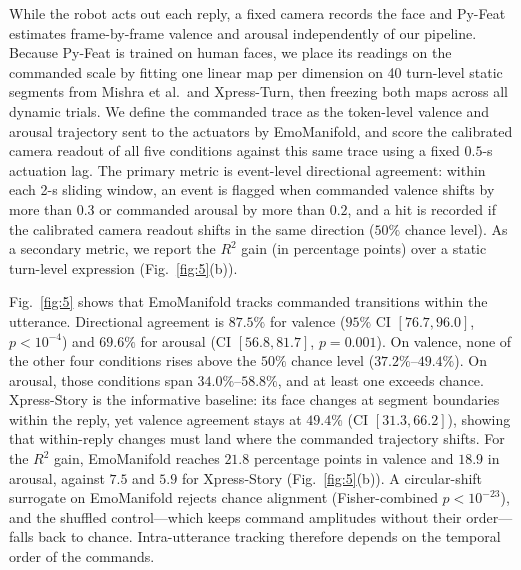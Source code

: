 \documentclass[letterpaper, 10 pt, conference]{ieeeconf/ieeeconf}
\begin{document}
While the robot acts out each reply, a fixed camera records the face and Py-Feat~\cite{cheong2023pyfeat} estimates frame-by-frame valence and arousal independently of our pipeline. Because Py-Feat is trained on human faces, we place its readings on the commanded scale by fitting one linear map per dimension on 40 turn-level static segments from Mishra et al.\ and Xpress-Turn, then freezing both maps across all dynamic trials. We define the commanded trace as the token-level valence and arousal trajectory sent to the actuators by EmoManifold, and score the calibrated camera readout of all five conditions against this same trace using a fixed $0.5$-s actuation lag. The primary metric is event-level directional agreement: within each 2-s sliding window, an event is flagged when commanded valence shifts by more than $0.3$ or commanded arousal by more than $0.2$, and a hit is recorded if the calibrated camera readout shifts in the same direction ($50\%$ chance level). As a secondary metric, we report the $R^2$ gain (in percentage points) over a static turn-level expression (Fig.~\ref{fig:5}(b)).

Fig.~\ref{fig:5} shows that EmoManifold tracks commanded transitions within the utterance. Directional agreement is $87.5\%$ for valence ($95\%$ CI $[76.7,96.0]$, $p<10^{-4}$) and $69.6\%$ for arousal (CI $[56.8,81.7]$, $p{=}0.001$). On valence, none of the other four conditions rises above the $50\%$ chance level ($37.2\%$--$49.4\%$). On arousal, those conditions span $34.0\%$--$58.8\%$, and at least one exceeds chance. Xpress-Story is the informative baseline: its face changes at segment boundaries within the reply, yet valence agreement stays at $49.4\%$ (CI $[31.3,66.2]$), showing that within-reply changes must land where the commanded trajectory shifts. For the $R^2$ gain, EmoManifold reaches $21.8$ percentage points in valence and $18.9$ in arousal, against $7.5$ and $5.9$ for Xpress-Story (Fig.~\ref{fig:5}(b)). A circular-shift surrogate on EmoManifold rejects chance alignment (Fisher-combined $p<10^{-23}$), and the shuffled control---which keeps command amplitudes without their order---falls back to chance. Intra-utterance tracking therefore depends on the temporal order of the commands.
\end{document}
